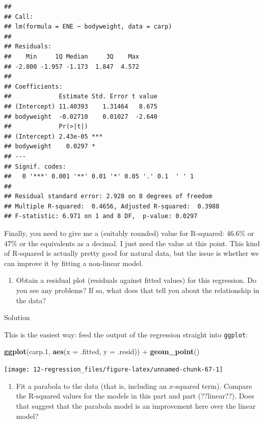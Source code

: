 \documentclass[]{tufte-book}
\newenvironment{Shaded}{}{}
\newcommand{\DataTypeTok}[1]{\textcolor[rgb]{0.56,0.13,0.00}{#1}}
\newcommand{\FloatTok}[1]{\textcolor[rgb]{0.25,0.63,0.44}{#1}}
\newcommand{\KeywordTok}[1]{\textcolor[rgb]{0.00,0.44,0.13}{\textbf{#1}}}
\newcommand{\NormalTok}[1]{#1}
\newcommand{\OperatorTok}[1]{\textcolor[rgb]{0.40,0.40,0.40}{#1}}
\newcommand{\StringTok}[1]{\textcolor[rgb]{0.25,0.44,0.63}{#1}}
\providecommand{\tightlist}{%
  \setlength{\itemsep}{0pt}\setlength{\parskip}{0pt}}
\theoremstyle{definition}
\theoremstyle{definition}
\theoremstyle{definition}
\theoremstyle{remark}
\begin{document}
\begin{verbatim}
## 
## Call:
## lm(formula = ENE ~ bodyweight, data = carp)
## 
## Residuals:
##    Min     1Q Median     3Q    Max 
## -2.800 -1.957 -1.173  1.847  4.572 
## 
## Coefficients:
##             Estimate Std. Error t value
## (Intercept) 11.40393    1.31464   8.675
## bodyweight  -0.02710    0.01027  -2.640
##             Pr(>|t|)    
## (Intercept) 2.43e-05 ***
## bodyweight    0.0297 *  
## ---
## Signif. codes:  
##   0 '***' 0.001 '**' 0.01 '*' 0.05 '.' 0.1  ' ' 1
## 
## Residual standard error: 2.928 on 8 degrees of freedom
## Multiple R-squared:  0.4656, Adjusted R-squared:  0.3988 
## F-statistic: 6.971 on 1 and 8 DF,  p-value: 0.0297
\end{verbatim}

Finally, you need to give me a (suitably rounded) value for R-squared:
46.6\% or 47\% or the equivalents as a decimal. I just need the value at
this point. This kind of R-squared is actually pretty good for natural
data, but the issue is whether we can improve it by fitting a non-linear
model.

\begin{enumerate}
\def\labelenumi{(\alph{enumi})}
\setcounter{enumi}{4}
\tightlist
\item
  Obtain a residual plot (residuals against fitted values) for this
  regression. Do you see any problems? If so, what does that tell you
  about the relationship in the data?
\end{enumerate}

Solution

This is the easiest way: feed the output of the regression straight into
\texttt{ggplot}:

\begin{Shaded}
\begin{Highlighting}[]
\KeywordTok{ggplot}\NormalTok{(carp}\FloatTok{.1}\NormalTok{, }\KeywordTok{aes}\NormalTok{(}\DataTypeTok{x =}\NormalTok{ .fitted, }\DataTypeTok{y =}\NormalTok{ .resid)) }\OperatorTok{+}\StringTok{ }
\StringTok{    }\KeywordTok{geom_point}\NormalTok{()}
\end{Highlighting}
\end{Shaded}

\texttt{[image: 12-regression\_files/figure-latex/unnamed-chunk-67-1]}

\begin{enumerate}
\def\labelenumi{(\alph{enumi})}
\setcounter{enumi}{5}
\tightlist
\item
  Fit a parabola to the data (that is, including an \(x\)-squared term).
  Compare the R-squared values for the models in this part and part
  (??linear??). Does that suggest that the parabola model is an
  improvement here over the linear model?
\end{enumerate}
\end{document}
